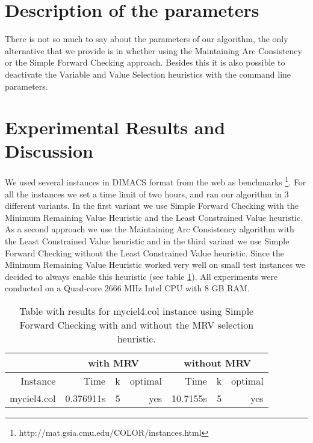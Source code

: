 \documentclass[a4paper]{scrartcl}
\begin{document}
\section{Description of the parameters}

There is not so much to say about the parameters of our algorithm, the only alternative that we provide is in whether using the Maintaining Arc Consistency or the Simple Forward Checking approach. Besides this it is also possible to deactivate the Variable and Value Selection heuristics with the command line parameters.

\section{Experimental Results and Discussion}

We used several instances in DIMACS format from the web as benchmarks \footnote{http://mat.gsia.cmu.edu/COLOR/instances.html}. For all the instances we set a time limit of two hours, and ran our algorithm in 3 different variants. In the first variant we use Simple Forward Checking with the Minimum Remaining Value Heuristic and the Least Constrained Value heuristic. As a second approach we use the Maintaining Arc Consistency algorithm with the Least Constrained Value heuristic and in the third variant we use Simple Forward Checking without the Least Constrained Value heuristic. Since the Minimum Remaining Value Heuristic worked very well on small test instances we decided to always enable this heuristic (see table \ref{mrvTable}). All experiments were conducted on a Quad-core 2666 MHz Intel CPU with 8 GB RAM.

\begin{table}
  \small
    \begin{adjustwidth}{-.5in}{-.5in}  
        \begin{center}
          \begin{tabular}{r | r | r | r | r | r | r }
            \hline
             & \multicolumn{3}{c|}{with MRV} & \multicolumn{3}{c|}{without MRV} \\
            \hline
Instance & Time & k & optimal &  Time & k & optimal  \\
\hline \hline
myciel4.col &  0.376911s & 5 & yes & 10.7155s & 5 & yes \\
\hline
\end{tabular}
        \caption{Table with results for myciel4.col instance using Simple Forward Checking with and without the MRV selection heuristic. }
        \label{mrvTable}
        \end{center}
    \end{adjustwidth}
\end{table}
\end{document}
